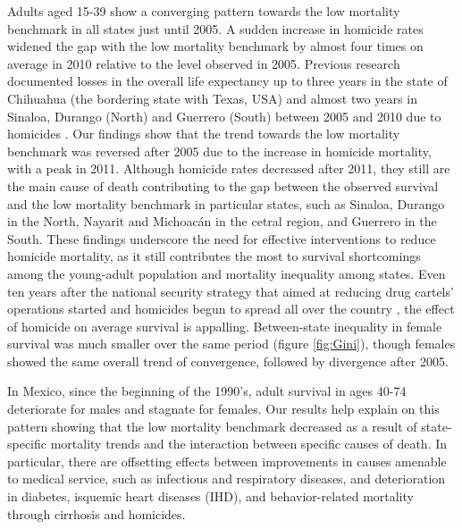 \documentclass{bmcart}
\begin{document}
Adults aged 15-39 show a converging pattern towards the low mortality benchmark in all states just until 2005. A sudden increase in homicide rates widened the gap with the low mortality benchmark by almost four times on average in 2010 relative to the level observed in 2005. Previous research documented losses in the overall life expectancy up to three years in the state of Chihuahua (the bordering state with Texas, USA) and almost two years in Sinaloa, Durango (North) and Guerrero (South) between 2005 and 2010 due to homicides \cite{Aburto2015}. Our findings show that the trend towards the low mortality benchmark was reversed after 2005 due to the increase in homicide mortality, with a peak in 2011. Although homicide rates decreased after 2011, they still are the main cause of death contributing to the gap between the observed survival and the low mortality benchmark in particular states, such as Sinaloa, Durango in the North, Nayarit and Michoac\'an in the cetral region, and Guerrero in the South. These findings underscore the need for effective interventions to reduce homicide mortality, as it still contributes the most to survival shortcomings among the young-adult population and mortality inequality among states. Even ten years after the national security strategy that aimed at reducing drug cartels' operations started and homicides begun to spread all over the country \cite{espinal2015analysis}, the effect of homicide on average survival is appalling. Between-state inequality in female survival was much smaller over the same period (figure \ref{fig:Gini}), though females showed the same overall trend of convergence, followed by divergence after 2005. 


In Mexico, since the beginning of the 1990's, adult survival in ages 40-74 deteriorate for males and stagnate for females. Our results help explain on this pattern showing that the low mortality benchmark decreased as a result of state-specific mortality trends and the interaction between specific causes of death. In particular, there are offsetting effects between improvements in causes amenable to medical service, such as infectious and respiratory diseases, and deterioration in diabetes, isquemic heart diseases (IHD), and behavior-related mortality through cirrhosis and homicides. 
\end{document}

